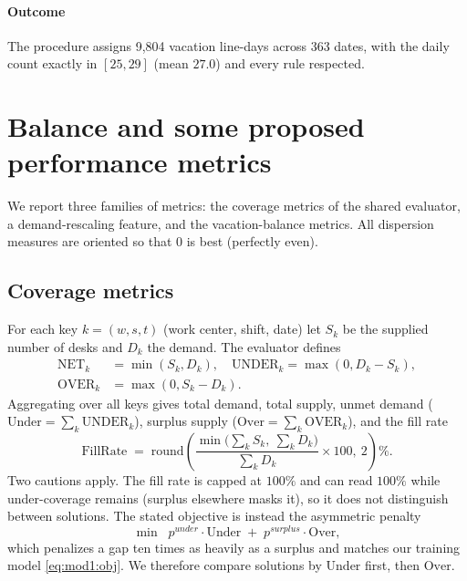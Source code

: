 \documentclass[preprint,12pt]{elsarticle}
\begin{document}
   \paragraph{Outcome} The procedure assigns 9,804 vacation line-days across 363 dates, with the daily count exactly in $[25,29]$ (mean $27.0$) and every rule respected.

\section{Balance and some proposed performance metrics} \label{sec:metrics}
   We report three families of metrics: the coverage metrics of the shared evaluator, a demand-rescaling feature, and the vacation-balance metrics. All dispersion measures are oriented so that $0$ is best (perfectly even).

   \subsection{Coverage metrics}
   For each key $k=(w,s,t)$ (work center, shift, date) let $S_k$ be the supplied number of desks and $D_k$ the demand. The evaluator defines
   \begin{equation}
      \begin{aligned}
         \mathrm{NET}_k &= \min(S_k, D_k), \quad
         \mathrm{UNDER}_k = \max(0, D_k - S_k),\\
         \mathrm{OVER}_k &= \max(0, S_k - D_k).
      \end{aligned}
   \end{equation}
   Aggregating over all keys gives total demand, total supply, unmet demand ($\mathrm{Under}=\sum_k \mathrm{UNDER}_k$), surplus supply ($\mathrm{Over}=\sum_k \mathrm{OVER}_k$), and the fill rate
   \begin{equation}
      \mathrm{FillRate} \;=\; \mathrm{round}\!\left(
      \frac{\min\!\big(\sum_k S_k,\ \sum_k D_k\big)}{\sum_k D_k}\times 100,\ 2
      \right)\% .
   \end{equation}
   Two cautions apply. The fill rate is capped at $100\%$ and can read $100\%$ while under-coverage remains (surplus elsewhere masks it), so it does not distinguish between solutions. The stated objective is instead the asymmetric penalty
   \begin{equation}
      \min \;\; p^{under} \cdot \mathrm{Under} \;+\; p^{surplus} \cdot \mathrm{Over},
   \end{equation}
   which penalizes a gap ten times as heavily as a surplus and matches our training model \eqref{eq:mod1:obj}. We therefore compare solutions by $\mathrm{Under}$ first, then $\mathrm{Over}$.
\end{document}
